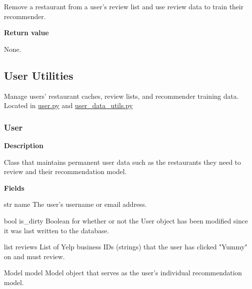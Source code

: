 \documentclass[11pt]{article}
\begin{document}
Remove a restaurant from a user's review list and use review data to train their recommender.

\textbf{Return value}

None.

\subsection{User Utilities}
Manage users' restaurant caches, review lists, and recommender training data. Located in \url{user.py} and \url{user\_data\_utils.py}

\subsubsection{User}
\textbf{Description}

Class that maintains permanent user data such as the restaurants they need to review and their recommendation model.

\textbf{Fields}
\begin{deflist}
	\item[str name] The user's username or email address.
	\item[bool is\_dirty] Boolean for whether or not the User object has been modified since it was last written to the database.
	\item[list reviews] List of Yelp business IDs (strings) that the user has clicked "Yummy" on and must review.
	\item[Model model] Model object that serves as the user's individual recommendation model.
\end{deflist}
\end{document}
